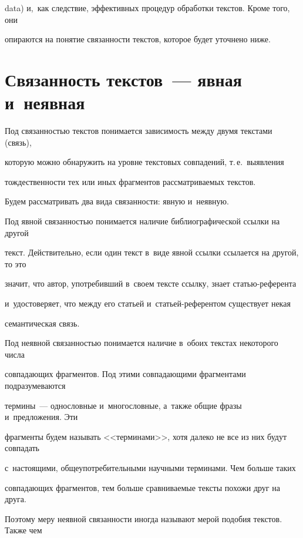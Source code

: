 data) и,~как следствие, эффективных процедур обработки текстов. Кроме того, они 

опираются на понятие связанности текстов, которое будет уточнено ниже.

     

\section{Связанность текстов~--- явная и~неявная}



     Под связанностью текстов понимается зависимость между двумя текстами (связь), 

которую можно обнаружить на уровне текстовых совпадений, т.\,е.\ выявления 

тождественности тех или иных фрагментов рассматриваемых текстов. 

     

     Будем рассматривать два вида связанности: явную и~неявную.



     

     Под явной связанностью понимается наличие библиографической ссылки на другой 

текст. Действительно, если один текст в~виде явной ссылки ссылается на другой, то это 

значит, что автор, употребивший в~своем тексте ссылку, знает статью-ре\-фе\-рен\-та 

и~удостоверяет, что между его статьей и~стать\-ей-ре\-фе\-рен\-том существует некая 

семантическая связь. 

     

     Под неявной связанностью понимается наличие в~обоих текстах некоторого числа 

совпадающих фрагментов. Под этими совпадающими фрагментами подразумеваются 

термины~--- однословные и~многословные, а~также общие фразы и~предложения. Эти 

фрагменты будем называть <<терминами>>, хотя далеко не все из них будут совпадать 

с~настоящими, общеупотребительными научными терминами. Чем больше таких 

совпадающих фрагментов, тем больше сравниваемые тексты похожи друг на друга. 

Поэтому меру неявной связанности иногда называют мерой подобия текстов. Также чем 

